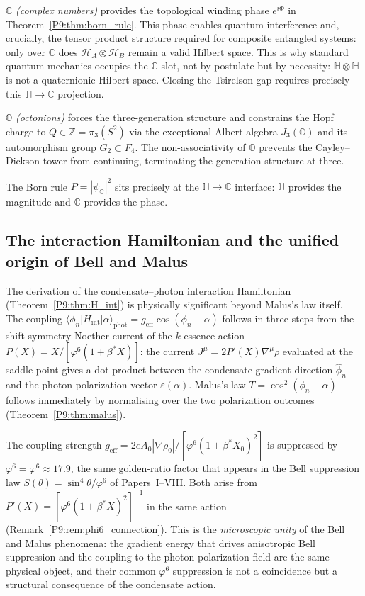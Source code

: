 \documentclass[11pt,a4paper]{article}
\theoremstyle{definition}
\theoremstyle{remark}
\newcommand{\vp}{\varphi}
\newcommand{\bst}{\beta^{*}}
\newcommand{\CC}{\mathbb{C}}
\newcommand{\HH}{\mathbb{H}}
\newcommand{\OO}{\mathbb{O}}
\newcommand{\ZZ}{\mathbb{Z}}
\begin{document}
$\CC$ \emph{(complex numbers)} provides the topological winding phase
$e^{i\Phi}$ in Theorem~\ref{P9:thm:born_rule}.
This phase enables quantum interference and, crucially, the tensor
product structure required for composite entangled systems: only over
$\CC$ does $\mathcal{H}_A\otimes\mathcal{H}_B$ remain a valid Hilbert
space.
This is why standard quantum mechanics occupies the $\CC$ slot, not by
postulate but by necessity: $\HH\otimes\HH$ is not a quaternionic
Hilbert space.
Closing the Tsirelson gap requires precisely this $\HH\to\CC$ projection.
 
$\OO$ \emph{(octonions)} forces the three-generation structure and
constrains the Hopf charge to $Q\in\ZZ=\pi_3(S^2)$ via the exceptional
Albert algebra $J_3(\OO)$ and its automorphism group $G_2\subset F_4$.
The non-associativity of $\OO$ prevents the Cayley--Dickson tower from
continuing, terminating the generation structure at three.
 
The Born rule $P=|\psi_\CC|^2$ sits precisely at the $\HH\to\CC$
interface: $\HH$ provides the magnitude and $\CC$ provides the phase.
 
\subsection{The interaction Hamiltonian and the unified origin of Bell
and Malus}
 
The derivation of the condensate--photon interaction Hamiltonian
(Theorem~\ref{P9:thm:H_int}) is physically significant beyond Malus's law
itself.
The coupling
$\langle\phi_n|H_\mathrm{int}|\alpha\rangle_\mathrm{phot}
= g_\mathrm{eff}\cos(\phi_n-\alpha)$
follows in three steps from the shift-symmetry Noether current of the
$k$-essence action $P(X)=X/[\vp^6(1+\bst X)]$:
the current $J^\mu = 2P'(X)\nabla^\mu\rho$ evaluated at the saddle
point gives a dot product between the condensate gradient direction
$\hat{\phi}_n$ and the photon polarization vector $\varepsilon(\alpha)$.
Malus's law $T = \cos^2(\phi_n-\alpha)$ follows immediately by
normalising over the two polarization outcomes (Theorem~\ref{P9:thm:malus}).
 
The coupling strength $g_\mathrm{eff} = 2eA_0|\nabla\rho_0|/[\vp^6(1+\bst X_0)^2]$
is suppressed by $\vp^6 = \varphi^6\approx17.9$, the same golden-ratio
factor that appears in the Bell suppression law $S(\theta)=\sin^4\theta/\vp^6$
of Papers~I--VIII.
Both arise from $P'(X) = [\vp^6(1+\bst X)^2]^{-1}$ in the same action
(Remark~\ref{P9:rem:phi6_connection}).
This is the \emph{microscopic unity} of the Bell and Malus phenomena:
the gradient energy that drives anisotropic Bell suppression and the
coupling to the photon polarization field are the same physical object,
and their common $\vp^6$ suppression is not a coincidence but a
structural consequence of the condensate action.
 
\end{document}
